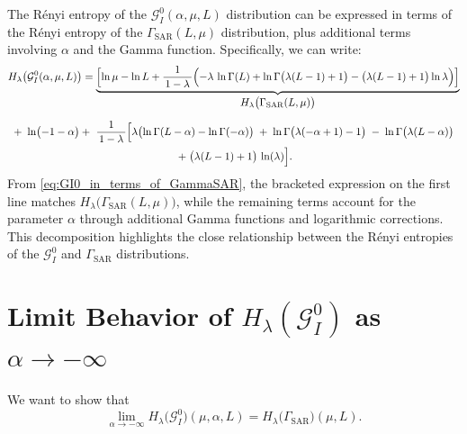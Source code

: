 \documentclass[
  letterpaper,
  11pt,
  english,
  doublespacing,
  headsepline,
  consistentlayout,
  oneside,
  openany]{MastersDoctoralThesis}
\begin{document}
The Rényi entropy of the \(\mathcal{G}^0_I(\alpha,\mu,L)\) distribution
can be expressed in terms of the Rényi entropy of the
\(\Gamma_{\mathrm{SAR}}(L,\mu)\) distribution, plus additional terms
involving \(\alpha\) and the Gamma function. Specifically, we can write:
\begin{multline}
H_\lambda\bigl(\mathcal{G}^0_I(\alpha,\mu,L)\bigr)
= 
\underbrace{\Bigl[
  \ln\mu -\ln L + \frac{1}{\,1-\lambda\,}\Bigl(
    -\lambda \,\ln\Gamma(L) 
    +\ln\Gamma\bigl(\lambda(L-1)+1\bigr)
    -\bigl(\lambda(L-1)+1\bigr)\ln\lambda
  \Bigr)
\Bigr]}_{\displaystyle H_\lambda\bigl(\Gamma_{\mathrm{SAR}}(L,\mu)\bigr)}
\\[6pt]
+~\ln\bigl(-1-\alpha\bigr)
+~\frac{1}{\,1-\lambda\,} 
 \Bigl[
   \lambda\bigl(\ln\Gamma(L-\alpha) - \ln\Gamma(-\alpha)\bigr)
   \;+\;\ln\Gamma\bigl(\lambda(-\alpha+1)-1\bigr)
   \;-\;\ln\Gamma\bigl(\lambda(L-\alpha)\bigr) \\
   \;+\;\bigl(\lambda(L-1)+1\bigr)\,\ln(\lambda)
 \Bigr].
\label{eq:GI0_in_terms_of_GammaSAR}
\end{multline} From \eqref{eq:GI0_in_terms_of_GammaSAR}, the bracketed
expression on the first line matches
\(H_\lambda\bigl(\Gamma_{\mathrm{SAR}}(L,\mu)\bigr)\), while the
remaining terms account for the parameter \(\alpha\) through additional
Gamma functions and logarithmic corrections. This decomposition
highlights the close relationship between the Rényi entropies of the
\(\mathcal{G}^0_I\) and \(\Gamma_{\mathrm{SAR}}\) distributions.

\chapter{\texorpdfstring{Limit Behavior of
\texorpdfstring{$H_\lambda(\mathcal{G}^0_I)$}{Hl(GI0)} as
\texorpdfstring{$\alpha \to -\infty$}{alpha->-∞}}{Limit Behavior of  as }}\label{limit-behavior-of-as}

We want to show that \[
\lim_{\alpha \to -\infty}
H_\lambda\bigl(\mathcal{G}^0_I\bigr)(\mu, \alpha, L)
=
H_\lambda\bigl(\Gamma_{\mathrm{SAR}}\bigr)(\mu, L).
\]
\end{document}
